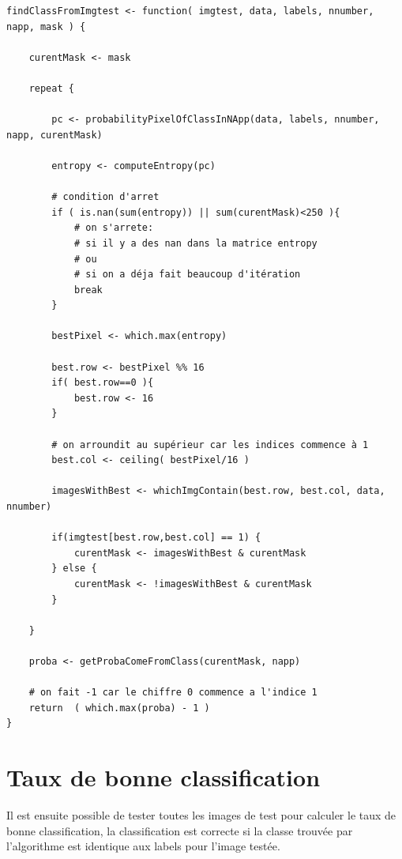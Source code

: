 \documentclass[a4paper,11pt]{article}
\begin{document}
  \begin{lstlisting}[caption=Algorithme principal du TP]
findClassFromImgtest <- function( imgtest, data, labels, nnumber, napp, mask ) {

    curentMask <- mask

    repeat {

        pc <- probabilityPixelOfClassInNApp(data, labels, nnumber, napp, curentMask)

        entropy <- computeEntropy(pc)

        # condition d'arret
        if ( is.nan(sum(entropy)) || sum(curentMask)<250 ){
            # on s'arrete: 
            # si il y a des nan dans la matrice entropy
            # ou 
            # si on a déja fait beaucoup d'itération
            break
        }

        bestPixel <- which.max(entropy)

        best.row <- bestPixel %% 16 
        if( best.row==0 ){
            best.row <- 16
        }

        # on arroundit au supérieur car les indices commence à 1
        best.col <- ceiling( bestPixel/16 )

        imagesWithBest <- whichImgContain(best.row, best.col, data, nnumber)

        if(imgtest[best.row,best.col] == 1) {
            curentMask <- imagesWithBest & curentMask
        } else {
            curentMask <- !imagesWithBest & curentMask
        }

    }

    proba <- getProbaComeFromClass(curentMask, napp)

    # on fait -1 car le chiffre 0 commence a l'indice 1
    return  ( which.max(proba) - 1 )
}
  \end{lstlisting}
  
  \newpage
  
  \section{Taux de bonne classification}
  Il est ensuite possible de tester toutes les images de test pour calculer le taux de bonne 
  classification, la classification est correcte si la classe trouvée par l'algorithme est 
  identique aux labels pour l'image testée.
\end{document}
